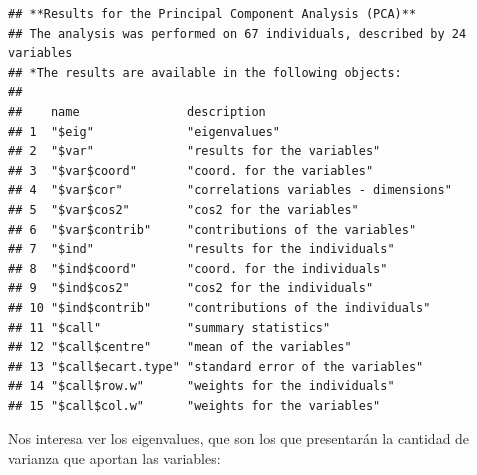 \documentclass[]{article}
\newenvironment{Shaded}{\begin{snugshade}}{\end{snugshade}}
\newcommand{\StringTok}[1]{\textcolor[rgb]{0.31,0.60,0.02}{#1}}
\newcommand{\OperatorTok}[1]{\textcolor[rgb]{0.81,0.36,0.00}{\textbf{#1}}}
\newcommand{\NormalTok}[1]{#1}
\begin{document}
\begin{verbatim}
## **Results for the Principal Component Analysis (PCA)**
## The analysis was performed on 67 individuals, described by 24 variables
## *The results are available in the following objects:
## 
##    name               description                          
## 1  "$eig"             "eigenvalues"                        
## 2  "$var"             "results for the variables"          
## 3  "$var$coord"       "coord. for the variables"           
## 4  "$var$cor"         "correlations variables - dimensions"
## 5  "$var$cos2"        "cos2 for the variables"             
## 6  "$var$contrib"     "contributions of the variables"     
## 7  "$ind"             "results for the individuals"        
## 8  "$ind$coord"       "coord. for the individuals"         
## 9  "$ind$cos2"        "cos2 for the individuals"           
## 10 "$ind$contrib"     "contributions of the individuals"   
## 11 "$call"            "summary statistics"                 
## 12 "$call$centre"     "mean of the variables"              
## 13 "$call$ecart.type" "standard error of the variables"    
## 14 "$call$row.w"      "weights for the individuals"        
## 15 "$call$col.w"      "weights for the variables"
\end{verbatim}

Nos interesa ver los eigenvalues, que son los que presentarán la
cantidad de varianza que aportan las variables:

\begin{Shaded}
\end{Shaded}
\end{document}
